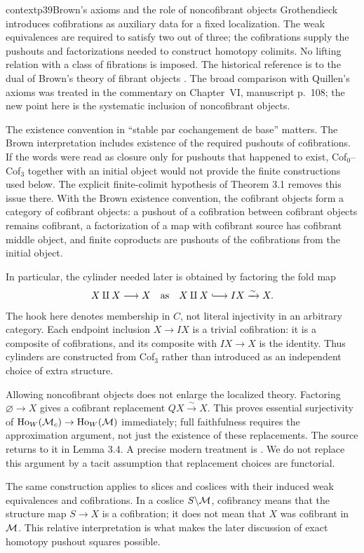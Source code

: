 \begin{dcomment}{context}{p39}{Brown's axioms and the role of noncofibrant objects}
Grothendieck introduces cofibrations as auxiliary data for a fixed localization. The weak equivalences are required to satisfy two out of three; the cofibrations supply the pushouts and factorizations needed to construct homotopy colimits. No lifting relation with a class of fibrations is imposed. The historical reference is to the dual of Brown's theory of fibrant objects \citep{Brown1973}. The broad comparison with Quillen's axioms was treated in the commentary on Chapter~VI, manuscript p.~108; the new point here is the systematic inclusion of noncofibrant objects.

The existence convention in ``stable par cochangement de base'' matters. The Brown interpretation includes existence of the required pushouts of cofibrations. If the words were read as closure only for pushouts that happened to exist, Cof$_0$--Cof$_3$ together with an initial object would not provide the finite constructions used below. The explicit finite-colimit hypothesis of Theorem 3.1 removes this issue there. With the Brown existence convention, the cofibrant objects form a category of cofibrant objects: a pushout of a cofibration between cofibrant objects remains cofibrant, a factorization of a map with cofibrant source has cofibrant middle object, and finite coproducts are pushouts of the cofibrations from the initial object.

In particular, the cylinder needed later is obtained by factoring the fold map
\[
 X\amalg X\longrightarrow X
 \quad\hbox{as}\quad
 X\amalg X\lhook\joinrel\longrightarrow IX\xrightarrow{\sim}X.
\]
The hook here denotes membership in $C$, not literal injectivity in an arbitrary category. Each endpoint inclusion $X\to IX$ is a trivial cofibration: it is a composite of cofibrations, and its composite with $IX\to X$ is the identity. Thus cylinders are constructed from Cof$_3$ rather than introduced as an independent choice of extra structure.

Allowing noncofibrant objects does not enlarge the localized theory. Factoring $\varnothing\to X$ gives a cofibrant replacement $QX\xrightarrow{\sim}X$. This proves essential surjectivity of $\operatorname{Ho}_W(\mathcal{M}_c)\to\operatorname{Ho}_W(\mathcal{M})$ immediately; full faithfulness requires the approximation argument, not just the existence of these replacements. The source returns to it in Lemma 3.4. A precise modern treatment is \citet[Theorem 6.1.6]{RadulescuBanu2009}. We do not replace this argument by a tacit assumption that replacement choices are functorial.

The same construction applies to slices and coslices with their induced weak equivalences and cofibrations. In a coslice $S\backslash\mathcal{M}$, cofibrancy means that the structure map $S\to X$ is a cofibration; it does not mean that $X$ was cofibrant in $\mathcal{M}$. This relative interpretation is what makes the later discussion of exact homotopy pushout squares possible.
\end{dcomment}


